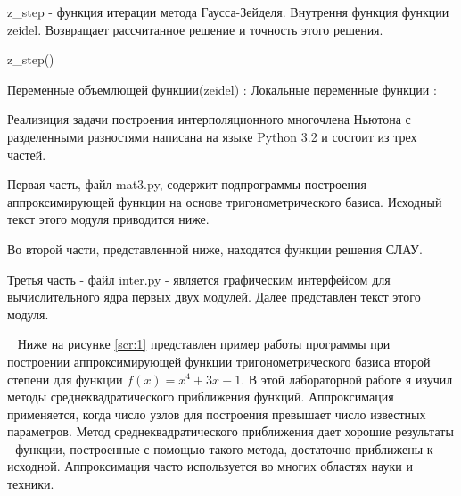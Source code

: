 {\item z\_step - функция итерации метода Гаусса-Зейделя. Внутрення функция функции zeidel.
	Возвращает рассчитанное решение и точность этого решения.

		z\_step()
			
Переменные объемлющей функции(zeidel)  :
Локальные переменные функции  :
}
\clearpage
{}
Реализиция задачи построения  интерполяционного многочлена Ньютона с разделенными разностями написана на языке Python 3.2 и состоит из трех частей.

Первая часть, файл mat3.py, содержит подпрограммы построения аппроксимирующей функции на основе тригонометрического базиса. Исходный текст этого модуля приводится ниже.


Во второй части, представленной ниже, находятся функции решения СЛАУ.


Третья часть - файл inter.py - является графическим интерфейсом для вычислительного ядра первых двух модулей. Далее представлен текст этого  модуля.


\clearpage

\ 
Ниже на рисунке \ref{scr:1} представлен пример работы программы при построении аппроксимирующей функции тригонометрического базиса второй степени для функции $f(x)=x^4+3x-1$.
\pic{SCR1.png}{Пример работы программы}{scr:1}{H}
\clearpage
{}
В этой лабораторной работе я изучил методы среднеквадратического приближения функций. Аппроксимация применяется, когда число узлов для построения превышает число известных параметров. Метод среднеквадратического приближения дает хорошие результаты - функции, построенные с помощью такого метода, достаточно приближены к исходной. Аппроксимация часто используется во многих областях науки и техники.

